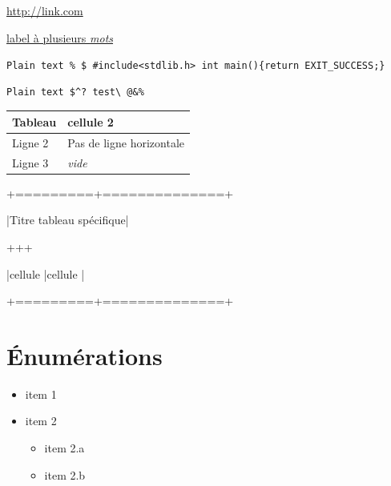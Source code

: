 \documentclass{article}
\begin{document}
		\url{http://link.com}

		\href{http://link.com/}{label à plusieurs \textit{mots}}

		\verb?Plain text % $ #include<stdlib.h> int main(){return EXIT_SUCCESS;}?

		

\begin{verbatim}
Plain text $^? test\ @&%
\end{verbatim}
		

		\begin{tabular}{|l|l|}
			\hline
			\textbf{Tableau} & cellule 2\\
			\hline
			Ligne 2 & Pas de ligne horizontale\\
			Ligne 3 & \textit{vide}\\
			\hline
		\end{tabular}

		


		

		+=========+==============+

		|Titre tableau spécifique|

		+\textendash \textendash \textendash \textendash \textendash \textendash \textendash \textendash \textendash +\textendash \textendash \textendash \textendash \textendash \textendash \textendash \textendash \textendash \textendash \textendash \textendash \textendash \textendash +

		|cellule  |cellule       |

		+=========+==============+

		

		\section{Énumérations}

			\begin{itemize}[label=$\bullet$]
				\item item 1
				\item item 2
					\begin{itemize}[label=$\bullet$]
						\item item 2.a
						\item item 2.b
					\end{itemize}
			\end{itemize}

			
\end{document}
